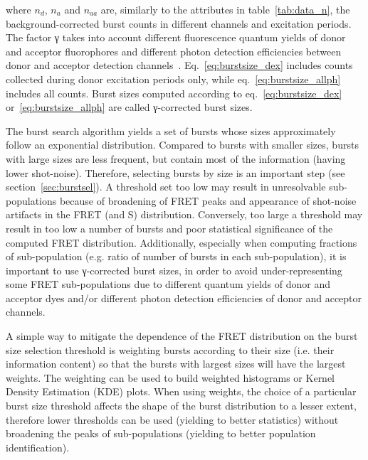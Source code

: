 \noindent where $n_d$, $n_a$ and $n_{aa}$ are, similarly to the attributes
in table~\ref{tab:data_n}, the background-corrected
burst counts in different channels and excitation periods.
The factor γ takes into account
different fluorescence quantum yields of donor and acceptor fluorophores and different
photon detection efficiencies between donor and acceptor detection
channels~\cite{Lee_2005}.
Eq.~\ref{eq:burstsize_dex} includes counts collected during donor excitation periods only,
while eq.~\ref{eq:burstsize_allph} includes all counts.
Burst sizes computed according to eq.~\ref{eq:burstsize_dex}
or~\ref{eq:burstsize_allph} are called γ-corrected burst sizes.

The burst search algorithm yields a set of bursts whose sizes
approximately follow an exponential distribution.
Compared to bursts with smaller sizes, bursts with large sizes are less frequent, 
but contain most of the information (having lower shot-noise).
Therefore, selecting bursts by size is an important step (see section~\ref{sec:burstsel}).
A threshold set too low may result in unresolvable sub-populations
because of broadening of FRET peaks and appearance of shot-noise artifacts
in the FRET (and S) distribution.
Conversely, too large a threshold may result in too low a number of bursts
and poor statistical significance of the computed FRET distribution.
Additionally, especially when computing fractions of sub-population 
(e.g. ratio of number of bursts in each sub-population),
it is important to use γ-corrected burst sizes,
in order to avoid under-representing some FRET sub-populations
due to different quantum yields of donor and acceptor dyes and/or
different photon detection efficiencies of donor and acceptor channels.

A simple way to mitigate the dependence of the FRET distribution on 
the burst size selection threshold is weighting bursts according to their size 
(i.e. their information content)
so that the bursts with largest sizes will have the largest weights.
The weighting can be used to build weighted histograms or Kernel Density
Estimation (KDE) plots. When using weights, the choice of a particular
burst size threshold affects the shape of the burst distribution to a lesser extent,
therefore lower thresholds can be used (yielding to better statistics)
without broadening the peaks of sub-populations (yielding to better
population identification).
